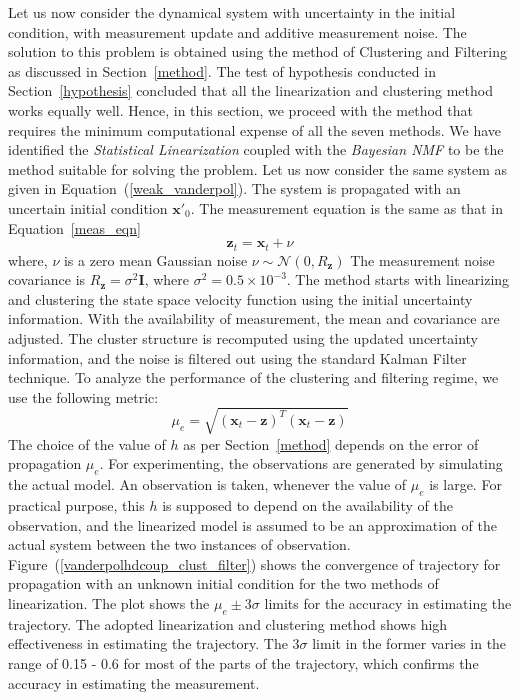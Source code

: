 Let us now consider the dynamical system with uncertainty in the initial condition, with measurement update and additive measurement noise. The solution to this problem is obtained using the method of Clustering and Filtering as discussed in Section~\ref{method}. The test of hypothesis conducted in Section~\ref{hypothesis} concluded that all the linearization and clustering method works equally well. Hence, in this section, we proceed with the method that requires the minimum computational expense of all the seven methods. We have identified the \textit{Statistical Linearization} coupled with the \textit{Bayesian NMF} to be the method suitable for solving the problem. Let us now consider the same system as given in Equation~(\ref{weak_vanderpol}). The system is propagated with an uncertain initial condition $\textbf{x}'_0$. The measurement equation is the same as that in Equation~\ref{meas_eqn}
\begin{equation}
\textbf{z}_t = \textbf{x}_t + \nu 
\end{equation}
\noindent where, $\nu$ is a zero mean Gaussian noise $\nu \sim \mathcal{N}(0,R_{\textbf{z}})$ The measurement noise covariance is $R_{\textbf{z}} = \sigma^2 \textbf{I}$, where $\sigma^2 = 0.5 \times 10^{-3}$. The method starts with linearizing and clustering the state space velocity function using the initial uncertainty information. With the availability of measurement, the mean and covariance are adjusted. The cluster structure is recomputed using the updated uncertainty information, and the noise is filtered out using the standard Kalman Filter technique. To analyze the performance of the clustering and filtering regime, we use the following metric:
\begin{equation}
\mu_e = \sqrt{(\textbf{x}_t - \textbf{z})^T(\textbf{x}_t - \textbf{z})}
\end{equation}
The choice of the value of $h$ as per Section~\ref{method} depends on the error of propagation $\mu_e$. For experimenting, the observations are generated by simulating the actual model. An observation is taken, whenever the value of $\mu_e$ is large. For practical purpose, this $h$ is supposed to depend on the availability of the observation, and the linearized model is assumed to be an approximation of the actual system between the two instances of observation. Figure~(\ref{vanderpolhdcoup_clust_filter}) shows the convergence of trajectory for propagation with an unknown initial condition for the two methods of linearization. 
The plot shows the $\mu_e \pm 3 \sigma$ limits for the accuracy in estimating the trajectory. The adopted linearization and clustering method shows high effectiveness in estimating the trajectory. The $3\sigma$ limit in the former varies in the range of 0.15 - 0.6 for most of the parts of the trajectory, which confirms the accuracy in estimating the measurement. 

